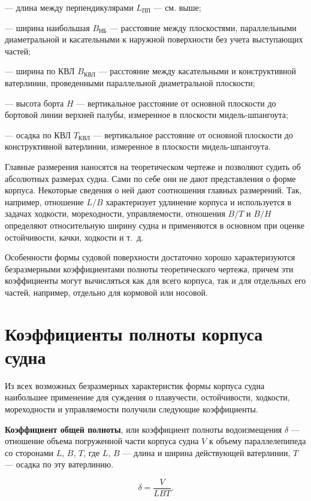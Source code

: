 --- длина между перпендикулярами $L_{\text{ПП}}$ --- см. выше;

--- ширина наибольшая $B_{\text{НБ}}$ --- расстояние между плоскостями, параллельными диаметральной и касательными к наружной поверхности без учета выступающих частей;

--- ширина по КВЛ $B_{\text{КВЛ}}$ --- расстояние между касательными и конструктивной ватерлинии, проведенными параллельной диаметральной плоскости;

--- высота борта $H$ --- вертикальное расстояние от основной плоскости до бортовой линии верхней палубы, измеренное в плоскости мидель-шпангоута;

--- осадка по КВЛ $T_{\text{КВЛ}}$ --- вертикальное расстояние от основной плоскости до конструктивной ватерлинии, измеренное в плоскости мидель-шпангоута.

Главные размерения наносятся на теоретическом чертеже и позволяют судить об абсолютных размерах судна.
Сами по себе они не дают представления о форме корпуса.
Некоторые сведения о ней дают соотношения главных размерений.
Так, например, отношение $L/B$ характеризует удлинение корпуса и используется в задачах ходкости, мореходности, управляемости, отношения $B/T$ и $B/H$ определяют относительную ширину судна и применяются в основном при оценке остойчивости, качки, ходкости и т.~д.

Особенности формы судовой поверхности достаточно хорошо характеризуются безразмерными коэффициентами полноты теоретического чертежа, причем эти коэффициенты могут вычисляться как для всего корпуса, так и для отдельных его частей, например, отдельно для кормовой или носовой.

\section{Коэффициенты полноты корпуса судна}

Из всех возможных безразмерных характеристик формы корпуса судна наибольшее применение для суждения о плавучести, остойчивости, ходкости, мореходности и управляемости получили следующие коэффициенты.

\textbf{Коэффициент общей полноты}, или коэффициент полноты водоизмещения $\delta$ --- отношение объема погруженной части корпуса судна $V$ к объему параллелепипеда со сторонами $L$, $B$, $T$, где $L$, $B$ --- длина и ширина действующей ватерлинии, $T$ --- осадка по эту ватерлинию.

\begin{equation}
    \delta = \frac{V}{L B T}.
\end{equation}

